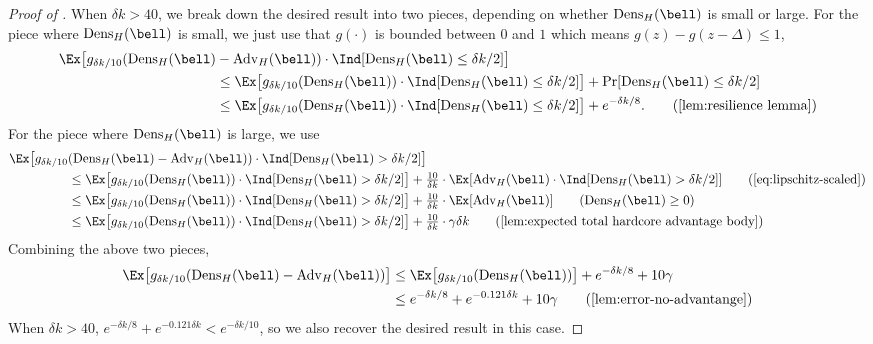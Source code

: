 \documentclass[11pt]{article}
\newcommand{\Dens}{\mathrm{Dens}}
\newcommand{\Adv}{\mathrm{Adv}}
\DeclarePairedDelimiter\bracket{[}{]}
\begin{document}
\begin{proof}[Proof of ]
    When $\delta k > 40$, we break down the desired result into two pieces, depending on whether $\Dens_H(\bell)$ is small or large. For the piece where $\Dens_H(\bell)$ is small, we just use that $g(\cdot)$ is bounded between $0$ and $1$ which means $g(z) - g(z-\Delta) \leq 1$,
    \begin{align*}
         \Ex\big[g_{\delta k/10}(\Dens_H(\bell) &- \Adv_H(\bell)) \cdot \Ind[\Dens_H(\bell) \leq \delta k/2]\big] \\
         &\leq \Ex\bracket*{g_{\delta k/10}(\Dens_H(\bell))\cdot \Ind[\Dens_H(\bell) \leq \delta k/2]} + \Pr[\Dens_H(\bell) \leq \delta k/2]\\
         &\leq  \Ex\bracket*{g_{\delta k/10}(\Dens_H(\bell))\cdot \Ind[\Dens_H(\bell) \leq \delta k/2]}  + e^{-\delta k/8}. \tag{\Cref{lem:resilience lemma}}
    \end{align*}
    For the piece where $\Dens_H(\bell)$ is large, we use 
    \begin{align*}
        \Ex\big[g_{\delta k/10}&(\Dens_H(\bell) - \Adv_H(\bell)) \cdot \Ind[\Dens_H(\bell) > \delta k/2]\big] \\
        &\leq \Ex\bracket*{g_{\delta k/10}(\Dens_H(\bell))\cdot \Ind[\Dens_H(\bell) > \delta k/2]} + \tfrac{10}{\delta k} \cdot \Ex\bracket*{\Adv_H(\bell)\cdot \Ind[\Dens_H(\bell) > \delta k/2]} \tag{\Cref{eq:lipschitz-scaled}} \\
        &\leq \Ex\bracket*{g_{\delta k/10}(\Dens_H(\bell))\cdot \Ind[\Dens_H(\bell) > \delta k/2]} + \tfrac{10}{\delta k} \cdot \Ex\bracket*{\Adv_H(\bell)} \tag{$\Dens_H(\bell) \geq 0$} \\
        &\leq \Ex\bracket*{g_{\delta k/10}(\Dens_H(\bell))\cdot \Ind[\Dens_H(\bell) > \delta k/2]} + \tfrac{10}{\delta k} \cdot \gamma \delta k \tag{\Cref{lem:expected total hardcore advantage body}} 
    \end{align*}
    Combining the above two pieces,
    \begin{align*}
        \Ex\big[g_{\delta k/10}(\Dens_H(\bell) - \Adv_H(\bell))\big] &\leq \Ex\big[g_{\delta k/10}(\Dens_H(\bell))\big] + e^{-\delta k/8} + 10\gamma \\
        &\leq e^{-\delta k/8} + e^{-0.121 \delta k} + 10\gamma \tag{\Cref{lem:error-no-advantange}}
    \end{align*}
    When $\delta k > 40$, $e^{-\delta k/8} + e^{-0.121 \delta k} < e^{-\delta k/10}$, so we also recover the desired result in this case.
\end{proof}
\end{document}
